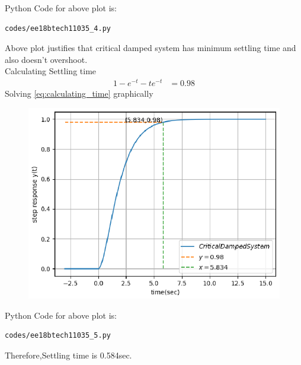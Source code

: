 \begin{enumerate}[label=\thesubsection.\arabic*.,ref=\thesubsection.\theenumi]
Python Code for above plot is:
\begin{lstlisting}
codes/ee18btech11035_4.py
\end{lstlisting}
Above plot justifies that critical damped system  has minimum settling time and also doesn't overshoot.\\
Calculating Settling time\\
\begin{align}
    \label{eq:calculating_time}
    1-e^{-t}-te^{-t}&=0.98
\end{align}
Solving \eqref{eq:calculating_time} graphically\\
\begin{figure}[!h]
\includegraphics[width=\columnwidth]{./figures/ee18btech11035_5.eps}
\caption{}
\label{fig:ee18btech11035_settling}
\end{figure}

Python Code for above plot is:
\begin{lstlisting}
codes/ee18btech11035_5.py
\end{lstlisting}
Therefore,Settling time is 0.584sec.
\end{enumerate}
